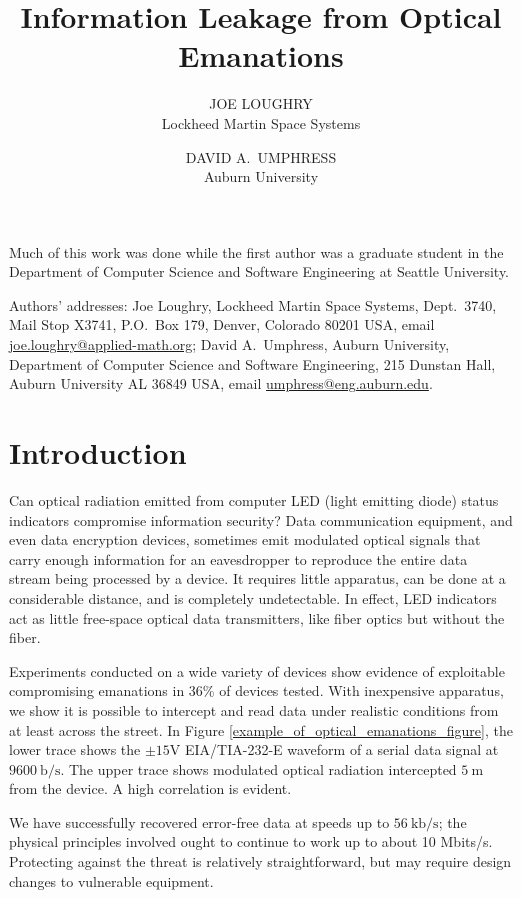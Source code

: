 \documentclass{acmtrans2e}
\title{Information Leakage from Optical Emanations}
\author{JOE LOUGHRY \\ Lockheed Martin Space Systems
\and DAVID A.\ UMPHRESS \\ Auburn University}
\begin{document}
\begin{bottomstuff}

Much of this work was done while the first author was a graduate student
in the Department of Computer Science and Software Engineering at Seattle
University.

Authors' addresses: Joe Loughry, Lockheed Martin Space Systems,
Dept.\ 3740, Mail Stop X3741,
P.O.\ Box 179, Denver, Colorado 80201 USA, email
\url{joe.loughry@applied-math.org};
David A.\ Umphress, Auburn University, Department of Computer Science and
Software Engineering, 215 Dunstan Hall, Auburn University AL 36849 USA,
email \url{umphress@eng.auburn.edu}.

\permission
\end{bottomstuff}

\maketitle

\section{Introduction}

Can optical radiation emitted from computer LED (light emitting diode)
status indicators compromise information security?  Data communication
equipment, and even data encryption devices, 
sometimes emit modulated optical signals that carry enough information 
for an eavesdropper to reproduce the entire data stream being processed 
by a device.  It requires little 
apparatus, can be done at a considerable distance, and is completely 
undetectable.  In effect, LED indicators act as little free-space 
optical data transmitters, like fiber optics but without the fiber.

Experiments conducted on a wide variety of devices show evidence of 
exploitable compromising emanations in 36\% of devices tested.  With 
inexpensive apparatus, we show it is possible to intercept and read data 
under realistic conditions from at least across the street.  In Figure 
\ref{example_of_optical_emanations_figure}, the lower trace shows the
$\pm15$V EIA/TIA-232-E waveform of a serial data signal at
$9600\ \mathrm{b}/\mathrm{s}$. 
The upper trace shows modulated optical radiation intercepted
$5\ \mathrm{m}$ from the device.  A high correlation is evident.

We have successfully recovered error-free data at
speeds up to $56\ \mathrm{kb}/\mathrm{s}$; the physical principles
involved ought to
continue to work up to about 10 Mbits/s.  Protecting against the 
threat is relatively straightforward, but may require design
changes to vulnerable equipment.
\end{document}
